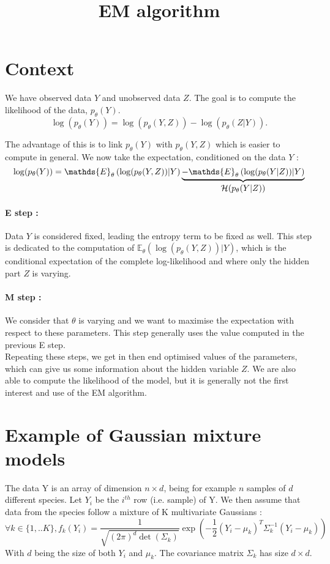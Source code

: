 \documentclass[a4paper,10pt]{article}
\title{EM algorithm}
\author{}
\begin{document}
\maketitle



\section{Context}

We have observed data $Y$ and unobserved data $Z$. The goal is to compute the likelihood of the data, $p_\theta (Y)$.
\[ \log(p_\theta (Y)) = \log (p_\theta (Y,Z)) - \log(p_\theta (Z|Y)).\]

The advantage of this is to link $p_\theta(Y)$ with $p_\theta (Y,Z)$ which is easier to compute in general. We now take the expectation,
conditioned on the data $Y$ :
\[ \log(p_\theta (Y) )= \mathds{E}_\theta \left(\log(p_\theta (Y,Z))|Y \right) \underbrace{- \mathds{E}_\theta \left(\log(p_\theta (Y|Z))|Y \right)}_{\text{\normalsize{$\mathcal{H}(p_\theta (Y|Z))$}}} \]

\paragraph{E step :}
Data $Y$ is considered fixed, leading the entropy term to be fixed as well. This step is dedicated to the computation of 
$\mathds{E}_\theta \left(\log(p_\theta (Y,Z))|Y \right)$, which is the conditional expectation of the complete log-likelihood and 
where only the hidden part $Z$ is varying. \\

\paragraph{M step :}
We consider that  $\theta$ is varying and we want to maximise the expectation with respect to these parameters. This step generally uses 
the value computed in the previous E step.\\

Repeating these steps, we get in then end optimised values of the parameters, which can give us some information about the hidden variable $Z$. 
We are also able to compute the likelihood of the model, but it is generally not the first interest and use of the EM algorithm.

\section{Example of Gaussian mixture models}
The data Y is an array of dimension $n\times d$, being for example $n$ samples of $d$ different species. Let
$Y_i$ be the $i^{th}$ row (i.e. sample) of Y. We then assume that data from the species follow a mixture of K multivariate Gaussians :
\[\forall k\in\{1,..K\}, f_k(Y_i) = \frac{1}{\sqrt{(2\pi)^d\det(\Sigma_k)}}\exp\left(-\frac{1}{2}(Y_i - \mu_k)^T\Sigma_k^{-1}(Y_i - \mu_k)\right)\]
With $d$ being the size of both $Y_i$ and $\mu_k$. The covariance matrix $\Sigma_k$ has size $d\times d$.\\
\end{document}
